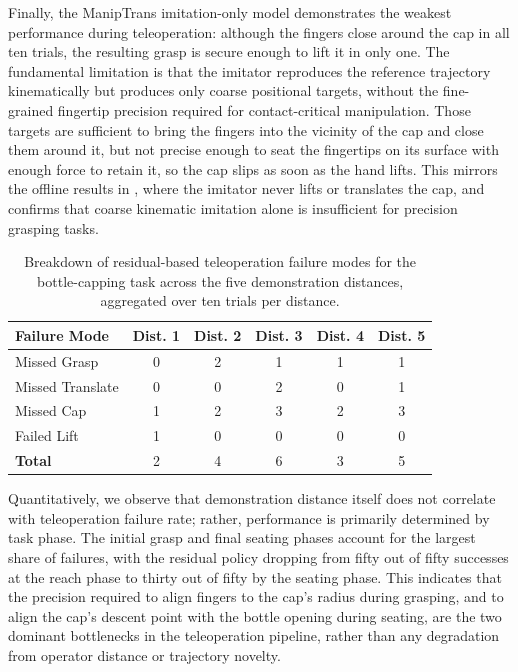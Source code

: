 Finally, the ManipTrans imitation-only model demonstrates the weakest performance during teleoperation: although the fingers close around the cap in all ten trials, the resulting grasp is secure enough to lift it in only one. The fundamental limitation is that the imitator reproduces the reference trajectory kinematically but produces only coarse positional targets, without the fine-grained fingertip precision required for contact-critical manipulation. Those targets are sufficient to bring the fingers into the vicinity of the cap and close them around it, but not precise enough to seat the fingertips on its surface with enough force to retain it, so the cap slips as soon as the hand lifts. This mirrors the offline results in , where the imitator never lifts or translates the cap, and confirms that coarse kinematic imitation alone is insufficient for precision grasping tasks.


\begin{table}[H]
\centering
\begin{tabular}{lccccc}
\toprule
\textbf{Failure Mode} & \textbf{Dist. 1} & \textbf{Dist. 2} & \textbf{Dist. 3} & \textbf{Dist. 4} & \textbf{Dist. 5} \\
\midrule
Missed Grasp & 0 & 2 & 1 & 1 & 1 \\
Missed Translate & 0 & 0 & 2 & 0 & 1 \\
Missed Cap & 1 & 2 & 3 & 2 & 3 \\
Failed Lift & 1 & 0 & 0 & 0 & 0 \\
\midrule
\textbf{Total} & 2 & 4 & 6 & 3 & 5 \\
\bottomrule
\end{tabular}
\caption{Breakdown of residual-based teleoperation failure modes for the bottle-capping task across the five demonstration distances, aggregated over ten trials per distance.}
\label{tab:bottle_failure_modes}
\end{table}

Quantitatively, we observe that demonstration distance itself does not correlate with teleoperation failure rate; rather, performance is primarily determined by task phase. The initial grasp and final seating phases account for the largest share of failures, with the residual policy dropping from fifty out of fifty successes at the reach phase to thirty out of fifty by the seating phase. This indicates that the precision required to align fingers to the cap’s radius during grasping, and to align the cap’s descent point with the bottle opening during seating, are the two dominant bottlenecks in the teleoperation pipeline, rather than any degradation from operator distance or trajectory novelty.

